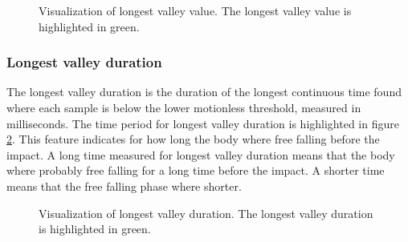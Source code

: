 \documentclass[12pt, a4paper, onecolumn]{article}
\begin{document}
	\begin{figure}[H]
		\centering
		\caption{Visualization of longest valley value. The longest valley value is highlighted in green.}%
		\label{fig:fall-data-longest-valley-value}%
	\end{figure}
	
	\subsubsection{Longest valley duration}
	
	The longest valley duration is the duration of the longest continuous time found where each sample is below the lower motionless threshold, measured in milliseconds. The time period for longest valley duration is highlighted in figure \ref{fig:fall-data-longest-valley-duration}. This feature indicates for how long the body where free falling before the impact. A long time measured for longest valley duration means that the body where probably free falling for a long time before the impact. A shorter time means that the free falling phase where shorter.
	
	\begin{figure}[H]
		\centering
		\caption{Visualization of longest valley duration. The longest valley duration is highlighted in green.}%
		\label{fig:fall-data-longest-valley-duration}%
	\end{figure}
	
\end{document}
